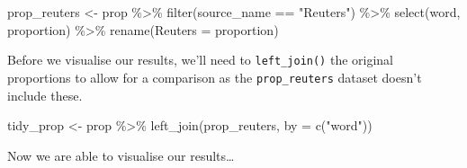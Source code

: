 \documentclass[
]{article}
\newenvironment{Shaded}{\begin{snugshade}}{\end{snugshade}}
\newcommand{\AttributeTok}[1]{\textcolor[rgb]{0.77,0.63,0.00}{#1}}
\newcommand{\FunctionTok}[1]{\textcolor[rgb]{0.00,0.00,0.00}{#1}}
\newcommand{\NormalTok}[1]{#1}
\newcommand{\OtherTok}[1]{\textcolor[rgb]{0.56,0.35,0.01}{#1}}
\newcommand{\SpecialCharTok}[1]{\textcolor[rgb]{0.00,0.00,0.00}{#1}}
\newcommand{\StringTok}[1]{\textcolor[rgb]{0.31,0.60,0.02}{#1}}
\begin{document}
\begin{Shaded}
\begin{Highlighting}[]
\NormalTok{prop\_reuters }\OtherTok{\textless{}{-}}\NormalTok{ prop }\SpecialCharTok{\%\textgreater{}\%}
                \FunctionTok{filter}\NormalTok{(source\_name }\SpecialCharTok{==} \StringTok{"Reuters"}\NormalTok{) }\SpecialCharTok{\%\textgreater{}\%}
                \FunctionTok{select}\NormalTok{(word, proportion) }\SpecialCharTok{\%\textgreater{}\%}
                \FunctionTok{rename}\NormalTok{(}\AttributeTok{Reuters =}\NormalTok{ proportion)}
\end{Highlighting}
\end{Shaded}

Before we visualise our results, we'll need to \texttt{left\_join()} the
original proportions to allow for a comparison as the
\texttt{prop\_reuters} dataset doesn't include these.

\begin{Shaded}
\begin{Highlighting}[]
\NormalTok{tidy\_prop }\OtherTok{\textless{}{-}}\NormalTok{ prop }\SpecialCharTok{\%\textgreater{}\%}
  \FunctionTok{left\_join}\NormalTok{(prop\_reuters, }\AttributeTok{by =} \FunctionTok{c}\NormalTok{(}\StringTok{"word"}\NormalTok{))}
\end{Highlighting}
\end{Shaded}

Now we are able to visualise our results\ldots{}
\end{document}
